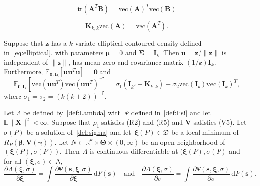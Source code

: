 \documentclass[10pt,a4paper]{amsart}
\newcommand{\E}{\mathbb{E}}
\newcommand{\R}{\mathbb{R}}
\newcommand{\bA}{\mathbf{A}}
\newcommand{\bB}{\mathbf{B}}
\newcommand{\bI}{\mathbf{I}}
\newcommand{\bK}{\mathbf{K}}
\newcommand{\bSigma}{\mathbf{\Sigma}}
\newcommand{\bTheta}{\bm\Theta}
\newcommand{\bV}{\mathbf{V}}
\newcommand{\bX}{\mathbf{X}}
\newcommand{\bbeta}{\bm\beta}
\newcommand{\bgamma}{\bm\gamma}
\newcommand{\bmu}{\bm\mu}
\newcommand{\bs}{\mathbf{s}}
\newcommand{\bu}{\mathbf{u}}
\newcommand{\bxi}{\bm\xi}
\newcommand{\bz}{\mathbf{z}}
\newcommand{\dd}{\mathrm{d}}
\newcommand{\tr}{\mathrm{tr}}
\newcommand{\vc}{\mathrm{vec}}
\begin{document}
\begin{equation}
\label{eq:trace vec}
\tr(\bA^T\bB)=\vc(\bA)^T\vc(\bB)
\end{equation}

\begin{equation}
\label{eq:prop K}
\bK_{k,k}\vc(\bA)=\vc(\bA^T).
\end{equation}

\begin{lemma}
\label{lem:Lemma 5.1}
Suppose that $\bz$ has a $k$-variate elliptical contoured density
defined in~\eqref{eq:elliptical}, with parameters $\bmu=\mathbf{0}$ and $\bSigma=\bI_k$.
Then $\bu=\bz/\|\bz\|$ is independent of $\|\bz\|$,
has mean zero and covariance matrix $(1/k)\bI_k$.
Furthermore, $\mathbb{E}_{\mathbf{0},\bI_k}[\bu\bu^T\bu]=\mathbf{0}$
and
\[
\mathbb{E}_{\mathbf{0},\bI_k}
\left[
\vc(\bu\bu^T)\vc(\bu\bu^T)^T
\right]
=
\sigma_1(\bI_{k^2}+\mathbf{K}_{k,k})+\sigma_2\vc(\bI_k)\vc(\bI_k)^T,
\]
where $\sigma_1=\sigma_2=(k(k+2))^{-1}$.
\end{lemma}

\begin{lemma}
\label{lem:change order int diff Lambda}
Let $\Lambda$ be defined by~\eqref{def:Lambda} with~$\Psi$ defined in~\eqref{def:Psi}
and let~$\E\|\bX\|^2<\infty$.
Suppose that $\rho_1$ satisfies (R2) and (R5) and $\bV$ satisfies (V5).
Let $\sigma(P)$ be a solution of~\eqref{def:sigma} and let~$\bxi(P)\in \mathfrak{D}$ be a local minimum of~$R_P(\bbeta,\bV(\bgamma))$.
Let $N\subset \R^k\times \bTheta\times(0,\infty)$ be an open neighborhood of~$(\bxi(P),\sigma(P))$.
Then~$\Lambda$ is continuous differentiable at $(\bxi(P),\sigma(P)$ and
for all $(\bxi,\sigma)\in N$,
\[
\frac{\partial\Lambda(\bxi,\sigma)}{\partial \bxi}
=
\int
\frac{\partial\Psi(\bs,\bxi,\sigma)}{\partial \bxi}\,\dd P(\bs)
\quad\text{and}\quad
\frac{\partial\Lambda(\bxi,\sigma)}{\partial \sigma}
=
\int
\frac{\partial\Psi(\bs,\bxi,\sigma)}{\partial \sigma}\,\dd P(\bs).
\]
\end{lemma}
\end{document}
